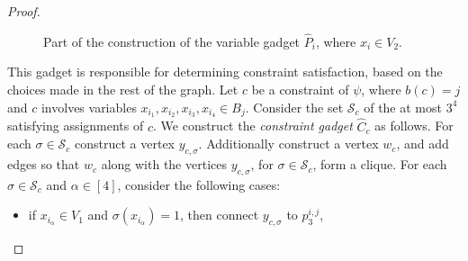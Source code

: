 \begin{proof}
\begin{figure}[ht]
        \caption{Part of the construction of the variable gadget $\hat{P}_i$, where $x_i \in V_2$.}
        \label{fig:induced:lb:block:V2}
    \end{figure}


    This gadget is responsible for determining constraint satisfaction,
    based on the choices made in the rest of the graph.
    Let $c$ be a constraint of $\psi$, where $b(c) = j$ and
    $c$ involves variables $x_{i_1},x_{i_2},x_{i_3}, x_{i_4} \in B_j$.
    Consider the set $\mathcal{S}_c$ of the at most $3^4$ satisfying assignments of $c$.
    We construct the \emph{constraint gadget} $\hat{C}_c$ as follows.
    For each $\sigma \in \mathcal{S}_c$ construct a vertex $y_{c,\sigma}$.
    Additionally construct a vertex $w_c$,
    and add edges so that $w_c$ along with the vertices $y_{c,\sigma}$, for $\sigma \in \mathcal{S}_c$,
    form a clique.
    For each $\sigma \in \mathcal{S}_c$ and $\alpha \in [4]$,
    consider the following cases:
    \begin{itemize}
        \item if $x_{i_\alpha} \in V_1$ and $\sigma(x_{i_\alpha}) = 1$,
        then connect $y_{c,\sigma}$ to $p^{i,j}_3$,


\end{itemize}
\end{proof}
